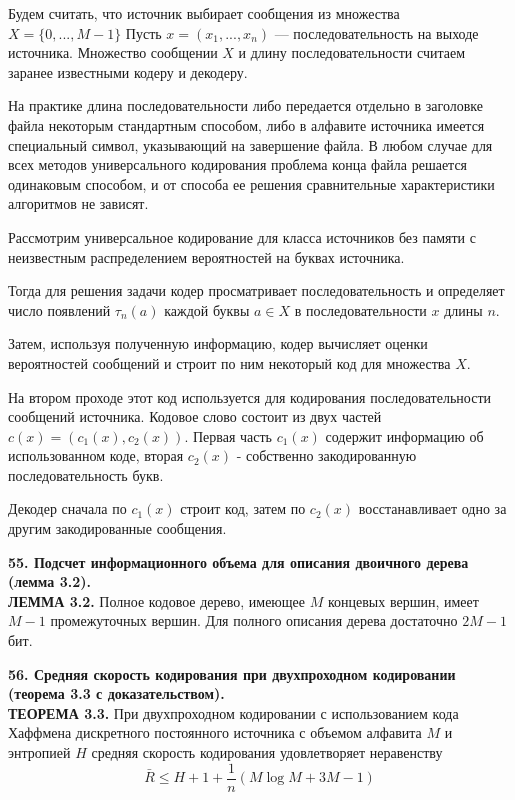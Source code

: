 \documentclass[14pt]{article}
\begin{document}
Будем считать, что источник выбирает сообщения из множества \(X = \{0,...,M-1\}\) Пусть \(x = (x_1,...,x_n)\) — последовательность на выходе источника. Множество сообщении \(X\) и длину последовательности считаем заранее известными кодеру и декодеру.

На практике длина последовательности либо передается отдельно в заголовке файла некоторым стандартным способом, либо в алфавите источника имеется специальный символ, указывающий на завершение файла. В любом случае для всех методов универсального кодирования проблема конца файла решается одинаковым способом, и от способа ее решения сравнительные характеристики алгоритмов не зависят.

Рассмотрим универсальное кодирование для класса источников без памяти с неизвестным распределением вероятностей на буквах источника.

Тогда для решения задачи кодер просматривает последовательность и определяет число появлений \(\tau_n(a)\) каждой буквы \(a \in X\) в последовательности \(x\) длины \(n\).

Затем, используя полученную информацию, кодер вычисляет оценки вероятностей сообщений и строит по ним некоторый код для множества \(X\).

На втором проходе этот код используется для кодирования последовательности сообщений источника. Кодовое слово состоит из двух частей \(c(x) = (c_1(x), c_2(x))\). Первая часть \(c_1(x)\) содержит информацию об использованном коде, вторая \(c_2(x)\) - собственно закодированную последовательность букв.

Декодер сначала по \(c_1(x)\) строит код, затем по \(c_2(x)\) восстанавливает одно за другим закодированные сообщения.

\bigskip
\textbf{55. Подсчет информационного объема для описания двоичного дерева (лемма 3.2).} \\

\textbf{ЛЕММА 3.2.} Полное кодовое дерево, имеющее \(M\) концевых вершин, имеет \(M - 1\) промежуточных вершин. Для полного описания дерева достаточно \(2M - 1\) бит.

\bigskip
\textbf{56. Средняя скорость кодирования при двухпроходном кодировании (теорема 3.3 с доказательством).} \\

\textbf{ТЕОРЕМА 3.3.} При двухпроходном кодировании с использованием кода Хаффмена дискретного постоянного источника с объемом алфавита \(M\) и энтропией \(H\) средняя скорость кодирования удовлетворяет неравенству
\begin{displaymath}
    \bar{R} \leq H + 1 + \frac{1}{n}(M\log M + 3M - 1)
\end{displaymath}
\end{document}
